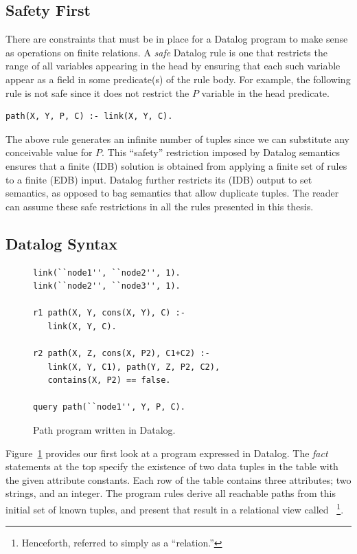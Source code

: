 \subsection{Safety First}
\label{ch:p2:sec:safety}

There are constraints that must be in place for a Datalog program to make sense
as operations on finite relations.  A {\em safe} Datalog rule is one that
restricts the range of all variables appearing in the head by ensuring that
each such variable appear as a field in some predicate(s) of the rule body.
For example, the following rule is not safe since it does not restrict the $P$
variable in the  head predicate.

\begin{lstlisting}[frame=none]
path(X, Y, P, C) :- link(X, Y, C).
\end{lstlisting}
The above rule generates an infinite number of  tuples since we can
substitute any conceivable value for $P$.  This ``safety'' restriction imposed
by Datalog semantics ensures that a finite (IDB) solution is obtained from
applying a finite set of rules to a finite (EDB) input.  Datalog further
restricts its (IDB) output to set semantics, as opposed to bag semantics that
allow duplicate tuples.  The reader can assume these safe restrictions in all
the rules presented in this thesis.

\subsection{Datalog Syntax}

\begin{figure}
\ssp
\begin{lstlisting}
link(``node1'', ``node2'', 1).
link(``node2'', ``node3'', 1).

r1 path(X, Y, cons(X, Y), C) :- 
   link(X, Y, C). 

r2 path(X, Z, cons(X, P2), C1+C2) :- 
   link(X, Y, C1), path(Y, Z, P2, C2),
   contains(X, P2) == false.

query path(``node1'', Y, P, C).
\end{lstlisting}
\caption{\label{ch:p2:fig:datalogPath}Path program written in Datalog.}
\end{figure}

Figure~\ref{ch:p2:fig:datalogPath} provides our first look at a program
expressed in Datalog.  The {\em fact} statements at the top specify the
existence of two data tuples in the  table with the given attribute
constants.  Each row of the  table contains three attributes; two
strings, and an integer.  The program rules derive all reachable paths from
this initial set of known  tuples, and present that result in a
relational view called ~\footnote{Henceforth, referred to simply as a
``relation.''}.

